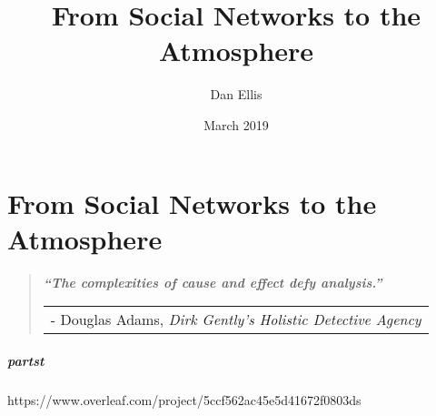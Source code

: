 \documentclass[twoside,reqno]{book}
\title{From Social Networks to the Atmosphere}
\author{Dan Ellis }
\date{March 2019}
\def\blankpage{%
      \clearpage%
      \thispagestyle{empty}%
      \addtocounter{page}{-1}%
      \null%
      \clearpage}
\begin{document}


\chapter{From Social Networks to the Atmosphere}
\restoregeometry
\begin{center}
\begin{quotation}
  \large{\emph{\textbf{``The complexities of cause and effect defy analysis.''} }  }  \\
  \begin{tabular}{l@{}}- Douglas Adams, \textit{Dirk Gently's Holistic Detective Agency}
 \end{tabular}
 \end{quotation}
\end{center}

\newpage
\doublespacing
\newpage
\tableofcontents
\newpage
\setlength{\footnotesep}{0.5cm}
\raggedbottom %













\paragraph{partst}

https://www.overleaf.com/project/5ccf562ac45e5d41672f0803ds






 

% 
\end{document}
